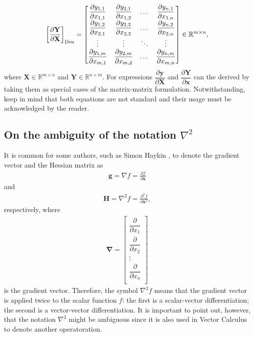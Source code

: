 \documentclass{article}
\begin{document}
\begin{align}
    \left[\frac{\partial \mathbf{Y}}{\partial\mathbf{X}}\right]_{\textnormal{Den}} = \begin{bmatrix}
        \dfrac{\partial y_{1,1}}{\partial x_{1,1}} & \dfrac{\partial y_{2,1}}{\partial x_{1,2}} & \dots & \dfrac{\partial y_{n,1}}{\partial x_{1,n}} \\
        \dfrac{\partial y_{1,2}}{\partial x_{2,1}} & \dfrac{\partial y_{2,2}}{\partial x_{2,2}} & \dots & \dfrac{\partial y_{n,2}}{\partial x_{2,n}} \\
        \vdots & \vdots & \ddots & \vdots \\
        \dfrac{\partial y_{1,m}}{\partial x_{m,1}} & \dfrac{\partial y_{2,m}}{\partial x_{m,2}} & \dots & \dfrac{\partial y_{n,m}}{\partial x_{m,n}} \\
    \end{bmatrix} \in \mathbb{R}^{m \times n},
\end{align}
where \(\mathbf{X}\in \mathbb{R}^{m\times n}\) and \(\mathbf{Y} \in \mathbb{R}^{n\times m}\). For expressions \(\dfrac{\partial \mathbf{y}}{\partial \mathbf{X}}\) and \(\dfrac{\partial \mathbf{Y}}{\partial \mathbf{x}}\) can the derived by taking them as special cases of the matrix-matrix formulation. Notwithstanding, keep in mind that both equations are not standard and their usage must be acknowledged by the reader.

\subsection{On the ambiguity of the notation \(\nabla^2\)}

It is common for some authors, such as Simon Haykin \cite{haykin2009neural}, to denote the gradient vector and the Hessian matrix as
\begin{align}
    \mathbf{g} = \nabla f = \frac{\partial f}{\partial \mathbf{x}}
\end{align}
and
\begin{align}
    \mathbf{H} = \nabla^{2} f = \frac{\partial^2 f}{\partial \mathbf{x}^2},
    \label{eq:H-nabla}
\end{align}
respectively, where
\begin{align}
    \mathbf{\nabla} = \begin{bmatrix}
        \dfrac{\partial}{\partial x_1} \\
        \dfrac{\partial}{\partial x_2} \\
        \vdots \\
        \dfrac{\partial}{\partial x_n} \\
    \end{bmatrix}
\end{align}
is the gradient vector. Therefore, the symbol \(\nabla^2 f\) means that the gradient vector is applied twice to the scalar function \(f\): the first is a scalar-vector differentiation; the second is a vector-vector differentiation. It is important to point out, however, that the notation \(\nabla^{2}\) might be ambiguous since it is also used in Vector Calculus to denote another operatoration.
\end{document}
